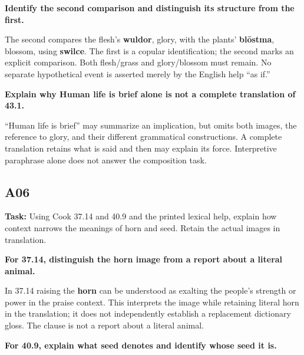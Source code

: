 \textbf{Identify the second comparison and distinguish its structure from the first.}

The second compares the flesh's \textbf{wuldor}, glory, with the plants' \textbf{blōstma}, blossom, using \textbf{swilce}. The first is a copular identification; the second marks an explicit comparison. Both flesh/\allowbreak{}grass and glory/\allowbreak{}blossom must remain. No separate hypothetical event is asserted merely by the English help “as if.”

\textbf{Explain why Human life is brief alone is not a complete translation of 43.1.}

“Human life is brief” may summarize an implication, but omits both images, the reference to glory, and their different grammatical constructions. A complete translation retains what is said and then may explain its force. Interpretive paraphrase alone does not answer the composition task.

\subsection*{A06}

\textbf{Task:} Using Cook 37.14 and 40.9 and the printed lexical help, explain how context narrows the meanings of horn and seed. Retain the actual images in translation.

\textbf{For 37.14, distinguish the horn image from a report about a literal animal.}

In 37.14 raising the \textbf{horn} can be understood as exalting the people's strength or power in the praise context. This interprets the image while retaining literal horn in the translation; it does not independently establish a replacement dictionary gloss. The clause is not a report about a literal animal.

\textbf{For 40.9, explain what seed denotes and identify whose seed it is.}

